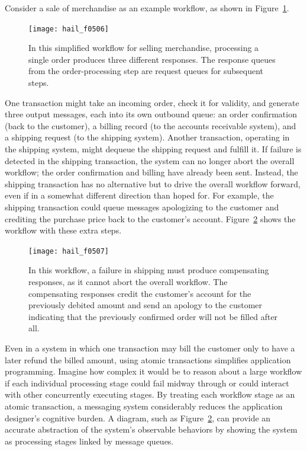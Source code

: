 Consider a sale of merchandise as an example workflow, as shown in
Figure~\ref{scan-5-6}.
\begin{figure}
\centerline{\texttt{[image: hail\_f0506]}}
\caption{In this simplified workflow for selling merchandise,
  processing a single order produces three different responses.  The
  response queues from the order-processing step are request queues
  for subsequent steps.}
\label{scan-5-6}
\end{figure}
One transaction might take an incoming order, check it for validity,
and generate three output messages, each into its own outbound queue:
an order confirmation (back to the customer), a billing record (to the
accounts receivable system), and a shipping request (to the shipping
system).  Another transaction, operating in the shipping
system, might dequeue the shipping request and fulfill it.  If
failure is detected in the shipping transaction, the system can no longer
abort the overall workflow; the order confirmation and
billing have already been sent.  Instead, the shipping transaction has
no alternative but to drive the overall workflow forward, even if in
a somewhat different direction than hoped for.  For example, the
shipping transaction could queue messages apologizing to the customer
and crediting the purchase price back to the customer's account.
Figure~\ref{scan-5-7} shows the workflow with these extra steps.
\begin{figure}
\centerline{\texttt{[image: hail\_f0507]}}
\caption{In this workflow, a failure in shipping must produce
  compensating responses, as it cannot abort the
  overall workflow.  The compensating responses credit the
  customer's account for the previously debited amount and send an
  apology to the customer indicating that the previously confirmed
  order will not be filled after all.}
\label{scan-5-7}
\end{figure}

Even in a system in which one transaction may bill the
customer only to have a later  refund
the billed amount, using atomic transactions simplifies application
programming.  Imagine how complex it would be to reason about a
large workflow if each individual processing stage could fail midway through or
could interact with other concurrently executing stages.  By treating
each workflow stage as an atomic transaction, a messaging system
considerably reduces the application designer's cognitive burden.  A
diagram, such as Figure~\ref{scan-5-7}, can provide an accurate abstraction of the system's observable
behaviors by showing the system as processing stages linked by message
queues.

